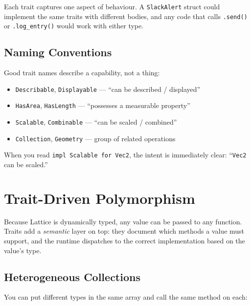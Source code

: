 Each trait captures one aspect of behaviour. A \lstinline|SlackAlert| struct
could implement the same traits with different bodies, and any code that
calls \lstinline|.send()| or \lstinline|.log_entry()| would work with
either type.

\subsection{Naming Conventions}

Good trait names describe a capability, not a thing:

\begin{itemize}
  \item \lstinline|Describable|, \lstinline|Displayable| --- ``can be described / displayed''
  \item \lstinline|HasArea|, \lstinline|HasLength| --- ``possesses a measurable property''
  \item \lstinline|Scalable|, \lstinline|Combinable| --- ``can be scaled / combined''
  \item \lstinline|Collection|, \lstinline|Geometry| --- group of related operations
\end{itemize}

When you read \lstinline|impl Scalable for Vec2|, the intent is
immediately clear: ``\lstinline|Vec2| can be scaled.''

\section{Trait-Driven Polymorphism}\label{sec:trait-polymorphism}

Because Lattice is dynamically typed, any value can be passed to any
function. Traits add a \emph{semantic} layer on top: they document which
methods a value must support, and the runtime dispatches to the correct
implementation based on the value's type.

\subsection{Heterogeneous Collections}

You can put different types in the same array and call the same method on
each:

